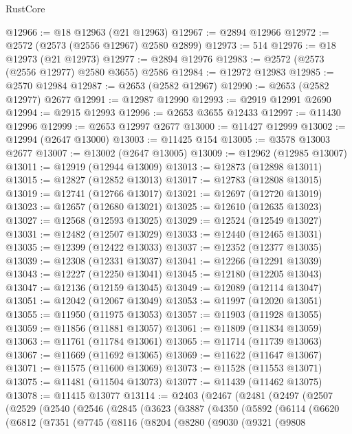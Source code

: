 \begin{lexlean}{RustCore}
\begin{coremodule}
@12966 := @18 @12963 (@21 @12963)
@12967 := @2894 @12966
@12972 := @2572 (@2573 (@2556 @12967) @2580 @2899)
@12973 := 514
@12976 := @18 @12973 (@21 @12973)
@12977 := @2894 @12976
@12983 := @2572 (@2573 (@2556 @12977) @2580 @3655) @2586
@12984 := @12972 @12983
@12985 := @2570 @12984
@12987 := @2653 (@2582 @12967)
@12990 := @2653 (@2582 @12977) @2677
@12991 := @12987 @12990
@12993 := @2919 @12991 @2690
@12994 := @2915 @12993
@12996 := @2653 @3655 @12433
@12997 := @11430 @12996
@12999 := @2653 @12997 @2677
@13000 := @11427 @12999
@13002 := @12994 (@2647 @13000)
@13003 := @11425 @154
@13005 := @3578 @13003 @2677
@13007 := @13002 (@2647 @13005)
@13009 := @12962 (@12985 @13007)
@13011 := @12919 (@12944 @13009)
@13013 := @12873 (@12898 @13011)
@13015 := @12827 (@12852 @13013)
@13017 := @12783 (@12808 @13015)
@13019 := @12741 (@12766 @13017)
@13021 := @12697 (@12720 @13019)
@13023 := @12657 (@12680 @13021)
@13025 := @12610 (@12635 @13023)
@13027 := @12568 (@12593 @13025)
@13029 := @12524 (@12549 @13027)
@13031 := @12482 (@12507 @13029)
@13033 := @12440 (@12465 @13031)
@13035 := @12399 (@12422 @13033)
@13037 := @12352 (@12377 @13035)
@13039 := @12308 (@12331 @13037)
@13041 := @12266 (@12291 @13039)
@13043 := @12227 (@12250 @13041)
@13045 := @12180 (@12205 @13043)
@13047 := @12136 (@12159 @13045)
@13049 := @12089 (@12114 @13047)
@13051 := @12042 (@12067 @13049)
@13053 := @11997 (@12020 @13051)
@13055 := @11950 (@11975 @13053)
@13057 := @11903 (@11928 @13055)
@13059 := @11856 (@11881 @13057)
@13061 := @11809 (@11834 @13059)
@13063 := @11761 (@11784 @13061)
@13065 := @11714 (@11739 @13063)
@13067 := @11669 (@11692 @13065)
@13069 := @11622 (@11647 @13067)
@13071 := @11575 (@11600 @13069)
@13073 := @11528 (@11553 @13071)
@13075 := @11481 (@11504 @13073)
@13077 := @11439 (@11462 @13075)
@13078 := @11415 @13077
@13114 := @2403
    (@2467
      (@2481
        (@2497
          (@2507
            (@2529
              (@2540
                (@2546
                  (@2845
                    (@3623
                      (@3887
                        (@4350
                          (@5892
                            (@6114
                              (@6620
                                (@6812
                                  (@7351
                                    (@7745
                                      (@8116
                                        (@8204
                                          (@8280
                                            (@9030
                                              (@9321
                                                (@9808

\end{coremodule}
\end{lexlean}
